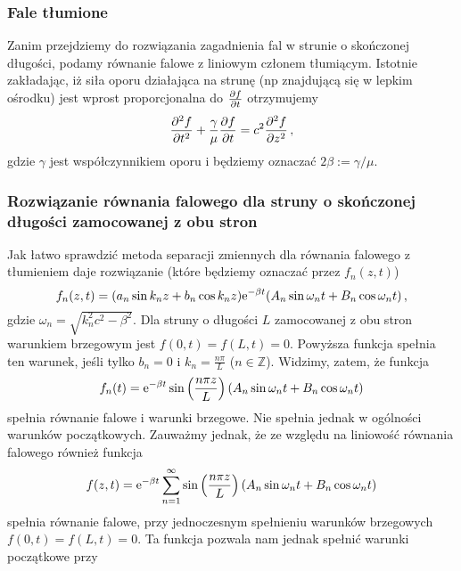 \documentclass[../main.tex]{subfiles}
\begin{document}
        \subsubsection{Fale tłumione}
        Zanim przejdziemy do rozwiązania zagadnienia fal w strunie o skończonej długości, podamy
        równanie falowe z liniowym członem tłumiącym. Istotnie zakładając, iż siła oporu działająca
        na strunę (np znajdującą się w lepkim  ośrodku) jest wprost proporcjonalna do \(\pdv{f}{t}\)
        otrzymujemy
        \begin{equation*}
            \pdv[2]{f}{t}+\frac{\gamma}{\mu}\pdv{f}{t}=c^2\pdv[2]{f}{z}\,,
        \end{equation*}
        gdzie \(\gamma\) jest współczynnikiem oporu i będziemy oznaczać \(2\beta:=\gamma/\mu\).
        \subsubsection{Rozwiązanie równania falowego dla struny o skończonej długości zamocowanej z obu stron}
        Jak łatwo sprawdzić metoda separacji zmiennych dla równania falowego z tłumieniem daje
        rozwiązanie (które będziemy oznaczać przez \(f_n(z,t)\))
        \begin{equation*}
            f_n(z,t)=(a_n\sin k_nz+b_n\cos k_nz)\mathrm{e}^{-\beta t}(A_n\sin\omega_n t+B_n\cos\omega_n t)\,,
        \end{equation*}
        gdzie \(\omega_n=\sqrt{k_n^2c^2-\beta^2}\). Dla struny o długości \(L\) zamocowanej z obu
        stron warunkiem brzegowym jest \(f(0,t)=f(L,t)=0\). Powyższa funkcja spełnia ten warunek,
        jeśli tylko \(b_n=0\) i \(k_n=\frac{n\pi}{L}\) (\(n\in\mathbb{Z}\)). Widzimy, zatem, że
        funkcja
        \begin{equation*}
            f_n(t)=\mathrm{e}^{-\beta t}\sin\left(\frac{n\pi z}{L}\right)(A_n\sin\omega_n t+B_n\cos\omega_n t)
        \end{equation*}
        spełnia równanie falowe i warunki brzegowe. Nie spełnia jednak w ogólności warunków
        początkowych. Zauważmy jednak, że ze względu na liniowość równania falowego również funkcja
        \begin{equation*}
            f(z,t)=\mathrm{e}^{-\beta t}\sum_{n=1}^\infty\sin\left(\frac{n\pi z}{L}\right)(A_n\sin\omega_n t+B_n\cos\omega_n t)
        \end{equation*}
        spełnia równanie falowe, przy jednoczesnym spełnieniu warunków brzegowych
        \(f(0,t)=f(L,t)=0\). Ta funkcja pozwala nam jednak spełnić warunki początkowe przy
\end{document}
